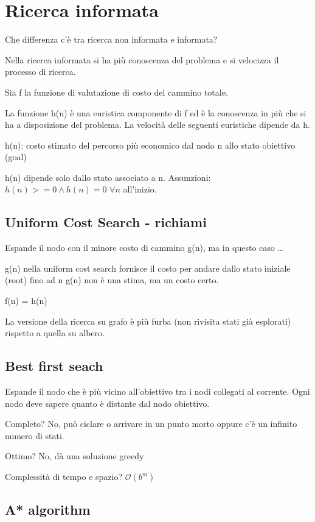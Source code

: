 \newpage

\section{Ricerca informata}

Che differenza c'è tra ricerca non informata e informata?

Nella ricerca informata si ha più conoscenza del problema e si
velocizza il processo di ricerca.

Sia f la funzione di valutazione di costo del cammino totale.

La funzione h(n) è una euristica componente di f ed è la
conoscenza in più che si ha a disposizione del problema. La
velocità delle seguenti euristiche dipende da h.

h(n): costo stimato del percorso più economico dal nodo n allo stato
obiettivo (goal)

h(n) dipende solo dallo stato associato a n.
Assunzioni: $h(n) >= 0 \land h(n) = 0$ $\forall n$ all'inizio.

\subsection{Uniform Cost Search - richiami}
Espande il nodo con il minore costo di cammino g(n), ma in questo caso \dots

g(n) nella uniform cost search fornisce il costo per andare dallo stato
iniziale (root) fino ad n g(n) non è una stima, ma un costo certo.

f(n) = h(n)

La versione della ricerca su grafo è più furba (non rivisita stati già esplorati)
rispetto a quella su albero. 

\subsection{Best first seach}
Espande il nodo che è più vicino all'obiettivo tra i nodi collegati al corrente.
Ogni nodo deve sapere quanto è distante dal nodo obiettivo.

Completo? No, può ciclare o arrivare in un punto morto oppure c'è un infinito
numero di stati.

Ottimo? No, dà una soluzione greedy

Complessità di tempo e spazio? $\mathcal{O}(b^m)$

\subsection{A* algorithm}


